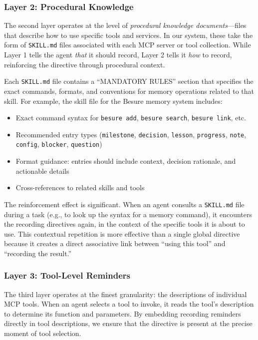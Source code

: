 \documentclass[11pt]{article}
\begin{document}
\subsubsection{Layer 2: Procedural Knowledge}

The second layer operates at the level of \emph{procedural knowledge documents}---files that describe how to use specific tools and services. In our system, these take the form of \texttt{SKILL.md} files associated with each MCP server or tool collection. While Layer 1 tells the agent \emph{that} it should record, Layer 2 tells it \emph{how} to record, reinforcing the directive through procedural context.

Each \texttt{SKILL.md} file contains a ``MANDATORY RULES'' section that specifies the exact commands, formats, and conventions for memory operations related to that skill. For example, the skill file for the Besure memory system includes:

\begin{itemize}
    \item Exact command syntax for \texttt{besure add}, \texttt{besure search}, \texttt{besure link}, etc.
    \item Recommended entry types (\texttt{milestone}, \texttt{decision}, \texttt{lesson}, \texttt{progress}, \texttt{note}, \texttt{config}, \texttt{blocker}, \texttt{question})
    \item Format guidance: entries should include context, decision rationale, and actionable details
    \item Cross-references to related skills and tools
\end{itemize}

The reinforcement effect is significant. When an agent consults a \texttt{SKILL.md} file during a task (e.g., to look up the syntax for a memory command), it encounters the recording directives again, in the context of the specific tools it is about to use. This contextual repetition is more effective than a single global directive because it creates a direct associative link between ``using this tool'' and ``recording the result.''

\subsubsection{Layer 3: Tool-Level Reminders}

The third layer operates at the finest granularity: the descriptions of individual MCP tools. When an agent selects a tool to invoke, it reads the tool's description to determine its function and parameters. By embedding recording reminders directly in tool descriptions, we ensure that the directive is present at the precise moment of tool selection.
\end{document}
